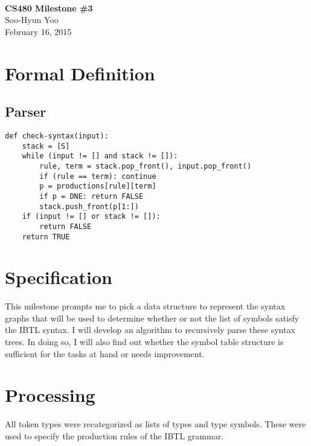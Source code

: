 \documentclass[12pt,letterpaper]{article}
\begin{document}
\fancyfoot{}
\begin{center}
    \hfill \\
    \vspace{4in}
    {\bf\Huge CS480 Milestone \#3 \\}
    \vspace{2in}
    {\Large Soo-Hyun Yoo \\ February 16, 2015}
\end{center}

\newpage
{}

%

\section*{Formal Definition}

\subsection*{Parser}

\begin{verbatim}
def check-syntax(input):
    stack = [S]
    while (input != [] and stack != []):
        rule, term = stack.pop_front(), input.pop_front()
        if (rule == term): continue
        p = productions[rule][term]
        if p = DNE: return FALSE
        stack.push_front(p[1:])
    if (input != [] or stack != []):
        return FALSE
    return TRUE
\end{verbatim}

\section*{Specification}

This milestone prompts me to pick a data structure to represent the syntax
graphs that will be used to determine whether or not the list of symbols
satisfy the IBTL syntax. I will develop an algorithm to recursively parse these
syntax trees. In doing so, I will also find out whether the symbol table
structure is sufficient for the tasks at hand or needs improvement.

\section*{Processing}

All token types were recategorized as lists of types and type symbols. These
were used to specify the production rules of the IBTL grammar.
\end{document}
